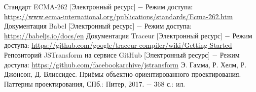 \documentclass[14pt, a4paper]{article}
\begin{document}
\begin{thebibliography}{9}
   Стандарт ECMA-262 [Электронный ресурс] $-$ Режим доступа: \linebreak
    \url{https://www.ecma-international.org/publications/standards/Ecma-262.htm}
   Документация Babel [Электронный ресурс] $-$ Режим доступа: \linebreak
    \url{https://babeljs.io/docs/en}
   Документация Traceur [Электронный ресурс] $-$ Режим доступа: \linebreak
    \url{https://github.com/google/traceur-compiler/wiki/Getting-Started}
   Репозиторий JSTransform на сервисе GitHub [Электронный ресурс] $-$ Режим доступа:
    \url{https://github.com/facebookarchive/jstransform}
   Э. Гамма, Р. Хелм, Р. Джонсон, Д. Влиссидес. Приёмы объектно-ориентированного проектирования. Паттерны проектирования, СПб.: Питер, 2017. $-$ 368 с.: ил.
\end{thebibliography}
\end{document}
